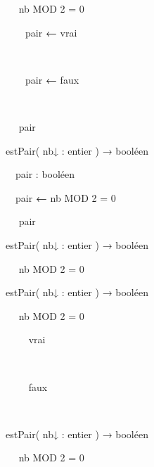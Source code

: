 {\sffamily
\ \  nb MOD 2 = 0 }

{\sffamily
\ \ \ \ pair
{\textbf{←}}{ vrai}}

{\sffamily
\ \ }

{\sffamily
\ \ \ \ pair
{\textbf{←}}{ faux}}

{\sffamily
\ \  }

{\sffamily
\ \  pair}

{\sffamily
{}}


\bigskip

{\sffamily
{} estPair( nb{↓ :} entier
) {→} booléen}

{\sffamily
\ \ pair : booléen}

{\sffamily
\ \ pair {\textbf{←}}{
nb }{MOD}{ 2 = 0}}

{\sffamily
\ \  pair}

{\sffamily
{}}


\bigskip

{\sffamily
{} estPair( nb{↓ :} entier
) {→} booléen}

{\sffamily
\ \  nb MOD 2 = 0}

{\sffamily
{}}


\bigskip


\bigskip

{\sffamily
{} estPair( nb{↓ :} entier
) {→} booléen}

{\sffamily
\ \  nb MOD 2 = 0 }

{\sffamily
\ \ \ \ 
{vrai}}

{\sffamily
\ \ }

{\sffamily
\ \ \ \ 
{faux}}

{\sffamily
\ \  }

{\sffamily
{}}


\bigskip

{\sffamily
{} estPair( nb{↓ :} entier
) {→} booléen}

{\sffamily
\ \  nb MOD 2 = 0 }

{\sffamily
\ \ \ \ }

